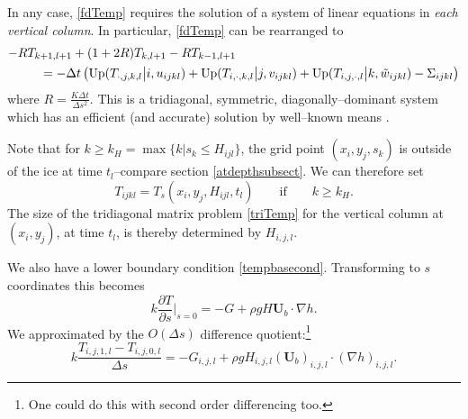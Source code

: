 \documentclass{amsart}%
\theoremstyle{plain}
\theoremstyle{definition}
\theoremstyle{remark}
\newcommand{\dds}[1]{\ensuremath{\frac{\partial #1}{\partial s}}}
\newcommand{\grad}{\nabla}
\newcommand{\bU}{{\mathbf{U}}}
\begin{document}
In any case, \eqref{fdTemp} requires the solution of a system of linear equations in \emph{each vertical column}.  In particular, \eqref{fdTemp} can be rearranged to
\begin{align}\label{triTemp}
-R &T_{k+1,l+1} + (1+2R) T_{k,l+1} - R T_{k-1,l+1} \\
    &\quad = -\Delta t \left(\operatorname{Up}(T_{\cdot,j,k,l} \big|i,u_{ijkl}) + \operatorname{Up}(T_{i,\cdot,k,l} \big|j,v_{ijkl}) + \operatorname{Up}(T_{i,j,\cdot,l} \big|k,\tilde w_{ijkl}) - \Sigma_{ijkl}\right)\notag
\end{align}
where $R=\frac{K\Delta t}{\Delta s^2}$.  This is a tridiagonal, symmetric, diagonally--dominant system which has an efficient (and accurate) solution by well--known means \cite{Pressetal}.

Note that for $k \ge k_H = \max\{k\big|s_k\le H_{ijl}\}$, the grid point $(x_i,y_j,s_k)$ is outside of the ice at time $t_l$--compare section \ref{atdepthsubsect}.  We can therefore set
\begin{equation}\label{Taboveice}
T_{ijkl}=T_s(x_i,y_j,H_{ijl},t_l) \qquad \text{if} \qquad k\ge k_H.
\end{equation}
The size of the tridiagonal matrix problem \eqref{triTemp} for the vertical column at $(x_i,y_j)$, at time $t_l$, is thereby determined by $H_{i,j,l}$.

We also have a lower boundary condition \eqref{tempbasecond}.  Transforming to $s$ coordinates this becomes
\begin{equation}\label{stempbasecond}
k\dds{T}\Big|_{s=0} = -G + \rho g H \bU_b\cdot \grad h.
\end{equation}
We approximated by the $O(\Delta s)$ difference quotient:\footnote{One could do this with second order differencing too.}
\begin{equation}\label{stempbasefd}
k\frac{T_{i,j,1,l}-T_{i,j,0,l}}{\Delta s} = -G_{i,j,l} +\rho g H_{i,j,l} (\bU_b)_{i,j,l}\cdot(\grad h)_{i,j,l}.
\end{equation}
\end{document}
